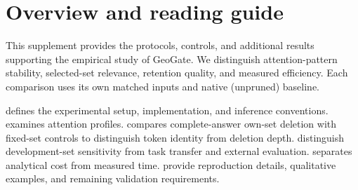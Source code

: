 \section*{Overview and reading guide}
\label{sec:supp_scope}

This supplement provides the protocols, controls, and additional results supporting the empirical study of GeoGate. We distinguish attention-pattern stability, selected-set relevance, retention quality, and measured efficiency. Each comparison uses its own matched inputs and native (unpruned) baseline.

 defines the experimental setup, implementation, and inference conventions.  examines attention profiles.  compares complete-answer own-set deletion with fixed-set controls to distinguish token identity from deletion depth.  distinguish development-set sensitivity from task transfer and external evaluation.  separates analytical cost from measured time.  provide reproduction details, qualitative examples, and remaining validation requirements.
